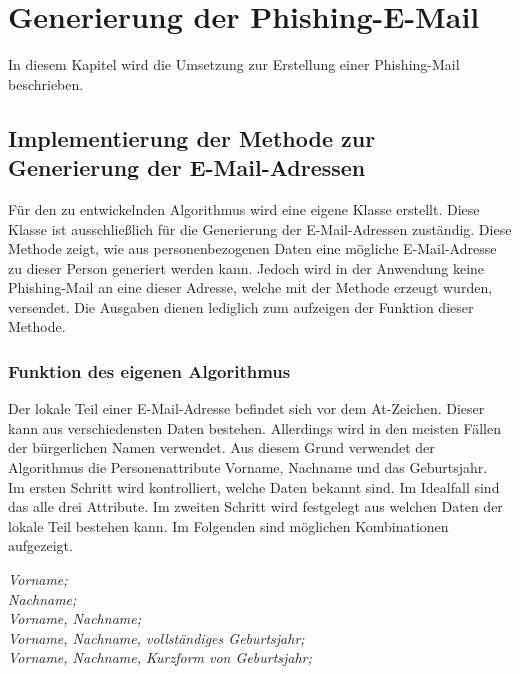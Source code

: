 
\chapter{Generierung der Phishing-E-Mail}  %
\label{cha:ErstellungeinerPhishing-Mail} %
In diesem Kapitel wird die Umsetzung zur Erstellung einer Phishing-Mail beschrieben.

\section{Implementierung der Methode zur Generierung der E-Mail-Adressen}	
Für den zu entwickelnden Algorithmus wird eine eigene Klasse erstellt. Diese Klasse ist ausschließlich für die Generierung der E-Mail-Adressen zuständig. Diese Methode zeigt, wie aus personenbezogenen Daten eine mögliche E-Mail-Adresse zu dieser Person generiert werden kann. Jedoch wird in der Anwendung keine Phishing-Mail an eine dieser Adresse, welche mit der Methode erzeugt wurden, versendet. Die Ausgaben dienen lediglich zum aufzeigen der Funktion dieser Methode.

	\subsection{Funktion des eigenen Algorithmus}
	Der lokale Teil einer E-Mail-Adresse befindet sich vor dem At-Zeichen. Dieser kann aus verschiedensten Daten bestehen. Allerdings wird in den meisten Fällen der bürgerlichen Namen verwendet. \cite{NameAlsEMail} Aus diesem Grund verwendet der Algorithmus die Personenattribute Vorname, Nachname und das Geburtsjahr.\\
	Im ersten Schritt wird kontrolliert, welche Daten bekannt sind. Im Idealfall sind das alle drei Attribute. Im zweiten Schritt wird festgelegt aus welchen Daten der lokale Teil bestehen kann. Im Folgenden sind möglichen Kombinationen aufgezeigt.
	
	\textit{Vorname;}\\
	\textit{Nachname;}\\
	\textit{Vorname, Nachname;}\\
	\textit{Vorname, Nachname, vollständiges Geburtsjahr;}\\
	\textit{Vorname, Nachname, Kurzform von Geburtsjahr;}
	
